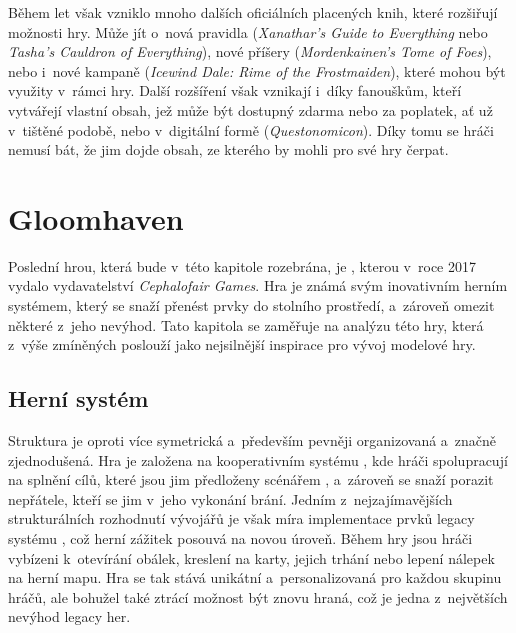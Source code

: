 Během let však vzniklo mnoho dalších oficiálních placených knih, které rozšiřují možnosti hry. Může jít o~nová pravidla (\textit{Xanathar's Guide to Everything} nebo \textit{Tasha's Cauldron of Everything}), nové příšery (\textit{Mordenkainen's Tome of Foes}), nebo i~nové kampaně (\textit{Icewind Dale: Rime of the Frostmaiden}), které mohou být využity v~rámci hry. Další rozšíření však vznikají i~díky fanouškům, kteří vytvářejí vlastní obsah, jež může být dostupný zdarma nebo za poplatek, ať už v~tištěné podobě, nebo v~digitální formě (\textit{Questonomicon}). Díky tomu se hráči nemusí bát, že jim dojde obsah, ze kterého by mohli pro své hry čerpat.



\section{Gloomhaven}
\label{sec:gloomhaven}

Poslední hrou, která bude v~této kapitole rozebrána, je , kterou v~roce 2017 vydalo vydavatelství \textit{Cephalofair Games}. Hra je známá svým inovativním herním systémem, který se snaží přenést prvky \dnd{} do stolního prostředí, a~zároveň omezit některé z~jeho nevýhod. Tato kapitola se zaměřuje na analýzu této hry, která z~výše zmíněných poslouží jako nejsilnější inspirace pro vývoj modelové hry. \cite{gloomhaven}

\subsection{Herní systém}
\label{subsec:gh_gameplay}

Struktura  je oproti \dnd{} více symetrická a~především pevněji organizovaná a~značně zjednodušená. Hra je založena na kooperativním systému , kde hráči spolupracují na splnění cílů, které jsou jim předloženy scénářem , a~zároveň se snaží porazit nepřátele, kteří se jim v~jeho vykonání brání. Jedním z~nejzajímavějších strukturálních rozhodnutí vývojářů je však míra implementace prvků legacy systému , což herní zážitek posouvá na novou úroveň. Během hry jsou hráči vybízeni k~otevírání obálek, kreslení na karty, jejich trhání nebo lepení nálepek na herní mapu. Hra se tak stává unikátní a~personalizovaná pro každou skupinu hráčů, ale bohužel také ztrácí možnost být znovu hraná, což je jedna z~největších nevýhod legacy her.

